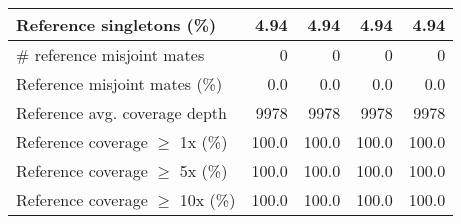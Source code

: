 \documentclass[12pt,a4paper]{article}
\begin{document}
\begin{table}[ht]
\begin{center}
\begin{tabular}{|l*{4}{|r}|}
Reference singletons (\%) & 4.94 & 4.94 & 4.94 & 4.94 \\ \hline
\# reference misjoint mates & 0 & 0 & 0 & 0 \\ \hline
Reference misjoint mates (\%) & 0.0 & 0.0 & 0.0 & 0.0 \\ \hline
Reference avg. coverage depth & 9978 & 9978 & 9978 & 9978 \\ \hline
Reference coverage $\geq$ 1x (\%) & 100.0 & 100.0 & 100.0 & 100.0 \\ \hline
Reference coverage $\geq$ 5x (\%) & 100.0 & 100.0 & 100.0 & 100.0 \\ \hline
Reference coverage $\geq$ 10x (\%) & 100.0 & 100.0 & 100.0 & 100.0 \\ \hline
\end{tabular}
\end{center}
\end{table}
\end{document}
